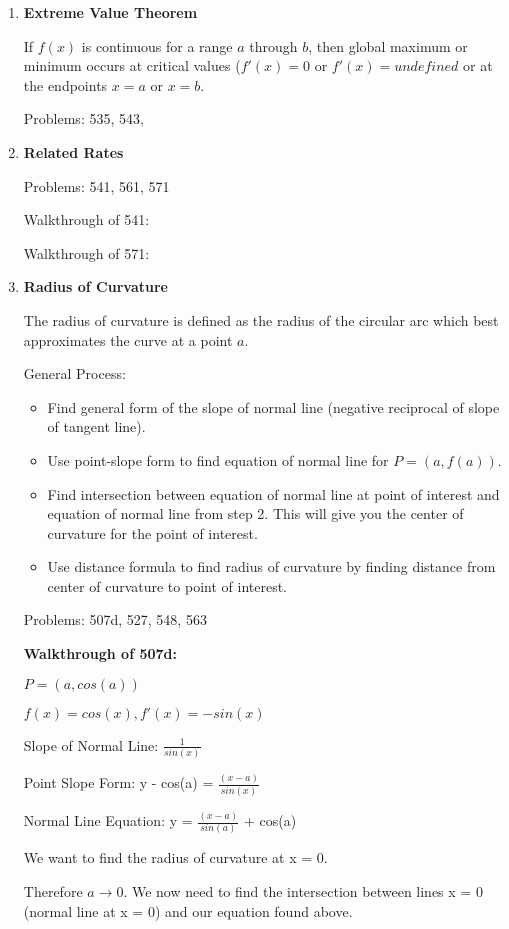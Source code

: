 \documentclass{article}
\begin{document}
\begin{enumerate}
\item \textbf{Extreme Value Theorem}

If $f(x)$ is continuous for a range $a$ through $b$, then global maximum or minimum occurs at critical values ($f'(x) = 0$ or $f'(x) = undefined$ or at the endpoints $x = a$ or $x = b$.

Problems: 535, 543, 

\item \textbf{Related Rates}

Problems: 541, 561, 571

Walkthrough of 541: 

Walkthrough of 571: 

\item \textbf{Radius of Curvature} 

The radius of curvature is defined as the radius of the circular arc which best approximates the curve at a point $a$. 

General Process:
\begin{itemize}
    \item Find general form of the slope of normal line (negative reciprocal of slope of tangent line). 
    \item Use point-slope form to find equation of normal line for $P = (a, f(a))$. 
    \item Find intersection between equation of normal line at point of interest and equation of normal line from step 2. This will give you the center of curvature for the point of interest.
    \item Use distance formula to find radius of curvature by finding distance from center of curvature to point of interest. 
\end{itemize}

Problems: 507d, 527, 548, 563

\textbf{Walkthrough of 507d:}

$P = (a, cos(a))$

$f(x) = cos(x), f'(x) = -sin(x)$

Slope of Normal Line: \(\frac{1}{sin(x)}\)

Point Slope Form: y - cos(a) = \(\frac{(x-a)}{sin(x)}\)

Normal Line Equation: y = \(\frac{(x-a)}{sin(a)}\) + cos(a)

We want to find the radius of curvature at x = 0.

Therefore $a \rightarrow\text{0}$. We now need to find the intersection between lines x = 0 (normal line at x = 0) and our equation found above.


\end{enumerate}
\end{document}
